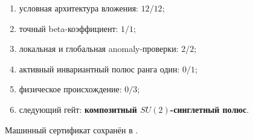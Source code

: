 \begin{protocol}\begin{enumerate}
\item условная архитектура вложения: \textbf{$12/12$};
\item точный beta-коэффициент: \textbf{$1/1$};
\item локальная и глобальная anomaly-проверки: \textbf{$2/2$};
\item активный инвариантный полюс ранга один: \textbf{$0/1$};
\item физическое происхождение: \textbf{$0/3$};
\item следующий гейт: \textbf{композитный $SU(2)$-синглетный полюс}.
\end{enumerate}\end{protocol}

Машинный сертификат сохранён в
.